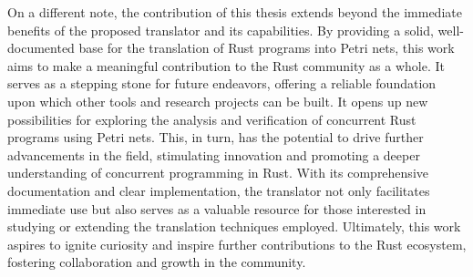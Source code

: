 On a different note, the contribution of this thesis extends
beyond the immediate benefits of the proposed translator and its capabilities.
By providing a solid, well-documented base for the translation of Rust programs into Petri nets,
this work aims to make a meaningful contribution to the Rust community as a whole.
It serves as a stepping stone for future endeavors,
offering a reliable foundation upon which other tools and research projects can be built.
It opens up new possibilities for exploring the analysis and verification
of concurrent Rust programs using Petri nets.
This, in turn, has the potential to drive further advancements in the field,
stimulating innovation and promoting a deeper understanding of concurrent programming in Rust.
With its comprehensive documentation and clear implementation,
the translator not only facilitates immediate use but also serves as a valuable resource
for those interested in studying or extending the translation techniques employed.
Ultimately, this work aspires to ignite curiosity and
inspire further contributions to the Rust ecosystem,
fostering collaboration and growth in the community.